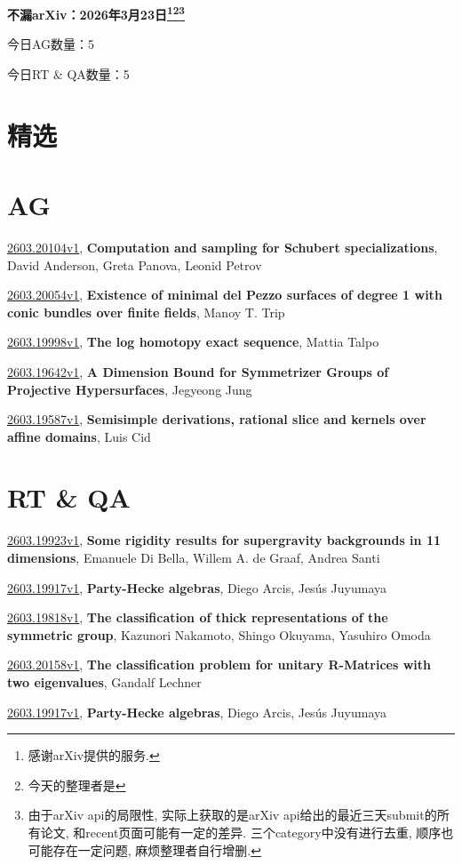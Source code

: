 \documentclass[9pt, a4paper]{article}
\theoremstyle{plain}
\theoremstyle{definition}
\theoremstyle{remark}
\newcommand{\arxiv}[3]{\href{https://arxiv.org/abs/#1}{#1}, \textbf{\textcolor{arxivblue}{#2}}, #3}
\newcommand{\AGnumber}{5}
\newcommand{\RTQAnumber}{5}
\newcommand{\NewestDate}{2026年3月23日}
\newcommand{\todayarXiver}{} %
\begin{document}
\begin{center}
    \Huge\textbf{不漏arXiv：\NewestDate\footnote{感谢arXiv提供的服务.}\footnote{今天的整理者是\todayarXiver}\footnote{由于arXiv api的局限性, 实际上获取的是arXiv api给出的最近三天submit的所有论文, 和recent页面可能有一定的差异. 三个category中没有进行去重, 顺序也可能存在一定问题, 麻烦整理者自行增删.}} \\
\end{center}

\setcounter{section}{-1}

\begin{center}
    今日AG数量：\AGnumber
    
    今日RT \& QA数量：\RTQAnumber
    
\end{center}


\section{精选}


\section{AG}
\arxiv{2603.20104v1}{Computation and sampling for Schubert specializations}{David Anderson, Greta Panova, Leonid Petrov}

\arxiv{2603.20054v1}{Existence of minimal del Pezzo surfaces of degree 1 with conic bundles over finite fields}{Manoy T. Trip}

\arxiv{2603.19998v1}{The log homotopy exact sequence}{Mattia Talpo}

\arxiv{2603.19642v1}{A Dimension Bound for Symmetrizer Groups of Projective Hypersurfaces}{Jegyeong Jung}

\arxiv{2603.19587v1}{Semisimple derivations, rational slice and kernels over affine domains}{Luis Cid}


\section{RT \& QA}
\arxiv{2603.19923v1}{Some rigidity results for supergravity backgrounds in 11 dimensions}{Emanuele Di Bella, Willem A. de Graaf, Andrea Santi}

\arxiv{2603.19917v1}{Party-Hecke algebras}{Diego Arcis, Jesús Juyumaya}

\arxiv{2603.19818v1}{The classification of thick representations of the symmetric group}{Kazunori Nakamoto, Shingo Okuyama, Yasuhiro Omoda}

\arxiv{2603.20158v1}{The classification problem for unitary R-Matrices with two eigenvalues}{Gandalf Lechner}

\arxiv{2603.19917v1}{Party-Hecke algebras}{Diego Arcis, Jesús Juyumaya}

\end{document}
